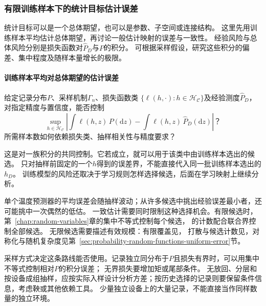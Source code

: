 \subsubsection{有限训练样本下的统计目标估计误差}
\label{sec:future-analysis-generalization}

统计目标可以是一个总体期望，也可以是参数、子空间或连接结构。
这里先用训练样本平均估计总体期望，再讨论一般估计映射的误差与一致性。
经验风险与总体风险分别是损失函数对$\widehat P_D$与$P$的积分。
可根据采样假设，研究这些积分的偏差、集中程度及随样本量增长的极限。

\paragraph{训练样本平均对总体期望的估计误差}

\begin{mathproblem}[有限训练样本对总体泛函的近似]
  \label{question:future-generalization}
  给定记录分布$P$、采样机制$\Gamma_n$、损失函数类
  $\{\ell(h,\cdot):h\in\mathcal H_{\mathcal C}\}$及经验测度$\widehat P_D$，
  对指定精度与置信度，能否控制
  \[
    \sup_{h\in\mathcal H_{\mathcal C}}
      \left|\int\ell(h,z)\,P(\mathrm dz)
      -\int\ell(h,z)\,\widehat P_D(\mathrm dz)\right|\text{？}
  \]
  所需样本数如何依赖损失类、抽样相关性与精度要求？
\end{mathproblem}

这是对一族积分的共同控制。它若成立，就可以用于该类中由训练样本选出的候选。
只对抽样前固定的一个$h$得到的误差界，不能直接代入同一批训练样本选出的$h_D$。
训练模型的风险还取决于学习规则怎样选择候选，后面在学习映射上继续分析。

单个温度预测器的平均误差会随抽样波动；从许多候选中挑出经验误差最小者，还可能挑中一次偶然的低估。
一致估计需要同时限制这种选择机会。有限候选时，第~\ref{chap:random-variables}章的集中不等式控制每个候选，
的计数配合联合界控制全部候选。
无限候选需要描述有效规模：有限覆盖见，
打散与候选计数见，对称化与随机复杂度见第~\ref{sec:probability-random-functions-uniform-error}节。

采样方式决定这条路线能否使用。记录独立同分布于$P$且损失有界时，可以用集中不等式控制相对$P$的积分误差；
无界损失要增加矩或尾部条件。
无放回、分层和按设备成组抽样，应按实际入样设计分析方差；按历史选择的记录则要保留条件信息，考虑鞅或其他依赖工具。
少量独立设备上的大量记录，不能直接当作同样数量的独立环境。

